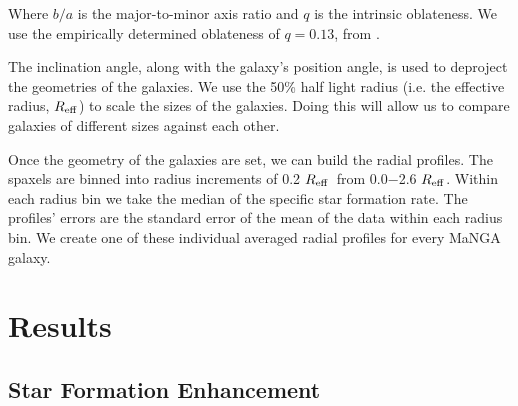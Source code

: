 \documentclass[iop,revtex4,twocolumn,apj,numberedappendix,appendixfloats]{emulateapj}
\newcommand{\reff}{$R_{\rm eff}$}
\begin{document}
Where $b/a$ is the major-to-minor axis ratio and $q$ is the intrinsic oblateness. We use the empirically determined oblateness of $q = 0.13$, from \citet{Giovanelli:1994}.

The inclination angle, along with the galaxy's position angle, is used to deproject the geometries of the galaxies. We use the 50\% half light radius (i.e. the effective radius, \reff) to scale the sizes of the galaxies. Doing this will allow us to compare galaxies of different sizes against each other.

Once the geometry of the galaxies are set, we can build the radial profiles. The spaxels are binned into radius increments of 0.2 \reff\ from 0.0$-$2.6 \reff. Within each radius bin we take the median of the specific star formation rate. The profiles' errors are the standard error of the mean of the data within each radius bin. We create one of these individual averaged radial profiles for every MaNGA galaxy. 



\section{Results}\label{sec:results}

\subsection{Star Formation Enhancement}
\end{document}
